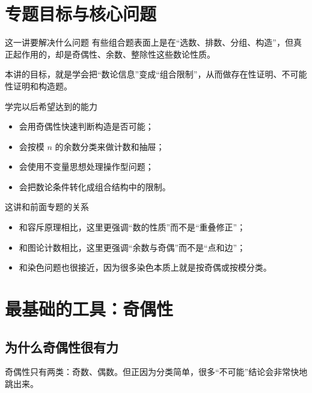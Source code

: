 \documentclass[11pt,a4paper,fontset=fandol]{ctexart}
\theoremstyle{formaltheorem}
\theoremstyle{formalexample}
\begin{document}
\pagestyle{plain}
\tableofcontents
\newpage
\pagestyle{fancy}

\section{专题目标与核心问题}

\begin{goalbox}{这一讲要解决什么问题}
有些组合题表面上是在“选数、排数、分组、构造”，但真正起作用的，却是奇偶性、余数、整除性这些数论性质。

本讲的目标，就是学会把“数论信息”变成“组合限制”，从而做存在性证明、不可能性证明和构造题。
\end{goalbox}

\begin{goalbox}{学完以后希望达到的能力}
\begin{itemize}
  \item 会用奇偶性快速判断构造是否可能；
  \item 会按模 $n$ 的余数分类来做计数和抽屉；
  \item 会使用不变量思想处理操作型问题；
  \item 会把数论条件转化成组合结构中的限制。
\end{itemize}
\end{goalbox}

\begin{notebox}{这讲和前面专题的关系}
\begin{itemize}
  \item 和容斥原理相比，这里更强调“数的性质”而不是“重叠修正”；
  \item 和图论计数相比，这里更强调“余数与奇偶”而不是“点和边”；
  \item 和染色问题也很接近，因为很多染色本质上就是按奇偶或按模分类。
\end{itemize}
\end{notebox}

\section{最基础的工具：奇偶性}

\subsection{为什么奇偶性很有力}
奇偶性只有两类：奇数、偶数。但正因为分类简单，很多“不可能”结论会非常快地跳出来。
\end{document}
